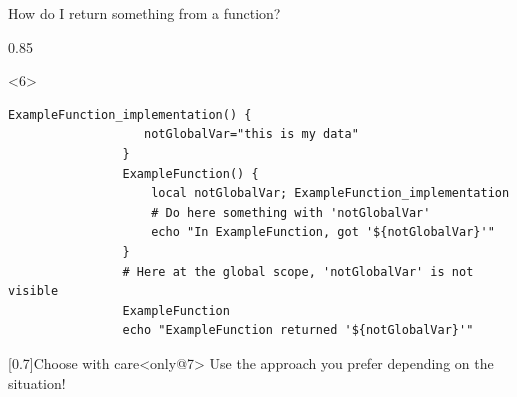 \begin{frame}[fragile]{How do I return something from a function?}
\begin{overlayarea}{\textwidth}{0.85\textheight}
\begin{onlyenv}
        \end{onlyenv}
        \begin{onlyenv}<6>
            \begin{lstlisting}[style=MyBash, numbers=none, emph={[7]notGlobalVar},]
                ExampleFunction_implementation() {
                   notGlobalVar="this is my data"
                }
                ExampleFunction() {
                    local notGlobalVar; ExampleFunction_implementation
                    # Do here something with 'notGlobalVar'
                    echo "In ExampleFunction, got '${notGlobalVar}'"
                }
                # Here at the global scope, 'notGlobalVar' is not visible
                ExampleFunction
                echo "ExampleFunction returned '${notGlobalVar}'"
            \end{lstlisting}
        \end{onlyenv}
        \vspace{-1mm}
        \begin{varblock}{}[0.7\textwidth]{Choose with care}<only@7>
            Use the approach you prefer depending on the situation!
        \end{varblock}
    \end{overlayarea}
\end{frame}
